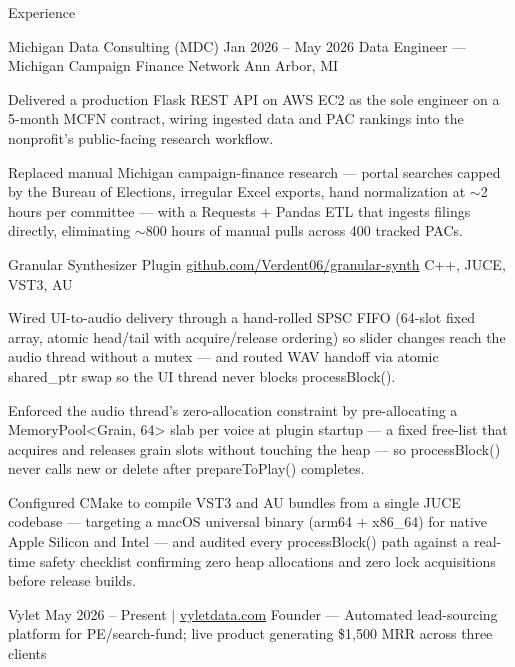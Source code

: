 \documentclass[
	11pt
]{../../../template}
\begin{document}
	\begin{rSection}{E}{xperience}
		\begin{rSectionEntry}
			{Michigan Data Consulting (MDC)}
			{Jan 2026 -- May 2026}
			{Data Engineer --- Michigan Campaign Finance Network}
			{}
			{Ann Arbor, MI}

			\item Delivered a production Flask REST API on AWS EC2 as the sole engineer on a 5-month MCFN contract, wiring ingested data and PAC rankings into the nonprofit's public-facing research workflow.
			\item Replaced manual Michigan campaign-finance research --- portal searches capped by the Bureau of Elections, irregular Excel exports, hand normalization at $\sim$2 hours per committee --- with a Requests + Pandas ETL that ingests filings directly, eliminating $\sim$800 hours of manual pulls across 400 tracked PACs.
		\end{rSectionEntry}

		\begin{rSectionEntry}
			{Granular Synthesizer Plugin}
			{\href{https://github.com/Verdent06/granular-synth}{github.com/Verdent06/granular-synth}}
			{}
			{C++, JUCE, VST3, AU}
			{}

			\item Wired UI-to-audio delivery through a hand-rolled SPSC FIFO (64-slot fixed array, atomic head/tail with acquire/release ordering) so slider changes reach the audio thread without a mutex --- and routed WAV handoff via atomic shared\_ptr swap so the UI thread never blocks processBlock().
			\item Enforced the audio thread's zero-allocation constraint by pre-allocating a MemoryPool\textless{}Grain, 64\textgreater{} slab per voice at plugin startup --- a fixed free-list that acquires and releases grain slots without touching the heap --- so processBlock() never calls new or delete after prepareToPlay() completes.
			\item Configured CMake to compile VST3 and AU bundles from a single JUCE codebase --- targeting a macOS universal binary (arm64 + x86\_64) for native Apple Silicon and Intel --- and audited every processBlock() path against a real-time safety checklist confirming zero heap allocations and zero lock acquisitions before release builds.
		\end{rSectionEntry}

		\begin{rSectionEntry}
			{Vylet}
			{May 2026 -- Present $\vert$ \href{https://vyletdata.com}{vyletdata.com}}
			{Founder --- Automated lead-sourcing platform for PE/search-fund; live product generating \$1,500 MRR across three clients}
			{}
			{}


\end{rSectionEntry}
\end{rSection}
\end{document}
